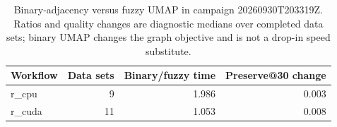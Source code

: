 \begin{table}[htbp]
\centering
\scriptsize
\caption{Binary-adjacency versus fuzzy UMAP in campaign 20260930T203319Z. Ratios and quality changes are diagnostic medians over completed data sets; binary UMAP changes the graph objective and is not a drop-in speed substitute.}
\label{tab:binary-umap}
\begin{tabular}{lrrr}
\toprule
Workflow & Data sets & Binary/fuzzy time & Preserve@30 change \\
\midrule
r\_cpu & 9 & 1.986 & 0.003 \\
r\_cuda & 11 & 1.053 & 0.008 \\
\bottomrule
\end{tabular}
\end{table}
